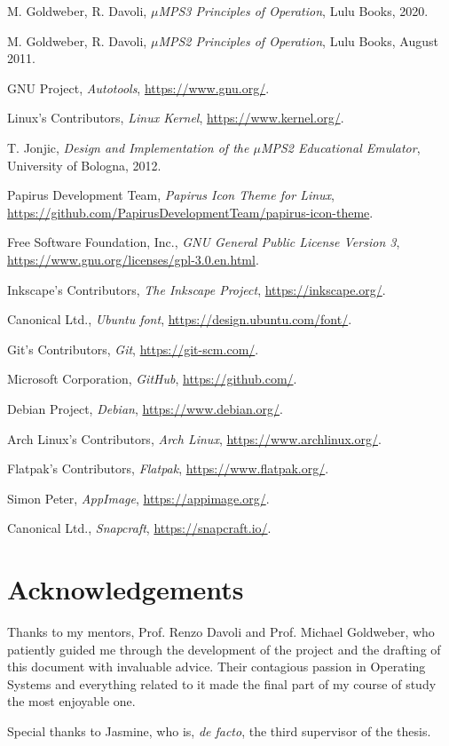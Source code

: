 \documentclass[12pt,a4paper,openright,twoside]{report}
\begin{document}
\begin{thebibliography}{99}
	M. Goldweber, R. Davoli,
	\textit{$\mu$MPS3 Principles of Operation},
	Lulu Books, 2020.

	M. Goldweber, R. Davoli,
	\textit{$\mu$MPS2 Principles of Operation},
	Lulu Books, August 2011.

	GNU Project,
	\textit{Autotools},
	\url{https://www.gnu.org/}.

	Linux's Contributors,
	\textit{Linux Kernel},
	\url{https://www.kernel.org/}.

	T. Jonjic,
	\textit{Design and Implementation of the $\mu$MPS2 Educational Emulator},
	University of Bologna, 2012.

	Papirus Development Team,
	\textit{Papirus Icon Theme for Linux},
	\url{https://github.com/PapirusDevelopmentTeam/papirus-icon-theme}.

	Free Software Foundation, Inc.,
	\textit{GNU General Public License Version 3},
	\url{https://www.gnu.org/licenses/gpl-3.0.en.html}.

	Inkscape's Contributors,
	\textit{The Inkscape Project},
	\url{https://inkscape.org/}.

	Canonical Ltd.,
	\textit{Ubuntu font},
	\url{https://design.ubuntu.com/font/}.

	Git's Contributors,
	\textit{Git},
	\url{https://git-scm.com/}.

	Microsoft Corporation,
	\textit{GitHub},
	\url{https://github.com/}.

	Debian Project,
	\textit{Debian},
	\url{https://www.debian.org/}.

	Arch Linux's Contributors,
	\textit{Arch Linux},
	\url{https://www.archlinux.org/}.

	Flatpak's Contributors,
	\textit{Flatpak},
	\url{https://www.flatpak.org/}.

	Simon Peter,
	\textit{AppImage},
	\url{https://appimage.org/}.

	Canonical Ltd.,
	\textit{Snapcraft},
	\url{https://snapcraft.io/}.

\end{thebibliography}

\chapter*{Acknowledgements}
Thanks to my mentors, Prof. Renzo Davoli and Prof. Michael Goldweber, who patiently guided me through the development of the project and the drafting of this document with invaluable advice.
Their contagious passion in Operating Systems and everything related to it made the final part of my course of study the most enjoyable one.

Special thanks to Jasmine, who is, \textit{de facto}, the third supervisor of the thesis.
\end{document}
